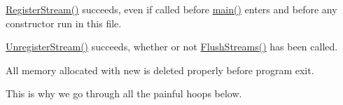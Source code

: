 \begin{DoxyItemize}
\item \hyperlink{group__fatalimpl_gad552ca3d6d85b95147b8c6a2eb4d4579}{Register\+Stream()} succeeds, even if called before {\ttfamily \hyperlink{namespacemodulegen____gcc__ILP32_aadf64690f6ba129a8d42469ea6da5a2d}{main()}} enters and before any constructor run in this file.
\item \hyperlink{group__fatalimpl_ga2bf70e98e990f01912527b4ccfac27d0}{Unregister\+Stream()} succeeds, whether or not \hyperlink{group__fatalimpl_gad96fb19ef26235aaccd15e6d2a72382f}{Flush\+Streams()} has been called.
\item All memory allocated with {\ttfamily new} is deleted properly before program exit.
\end{DoxyItemize}

This is why we go through all the painful hoops below. 